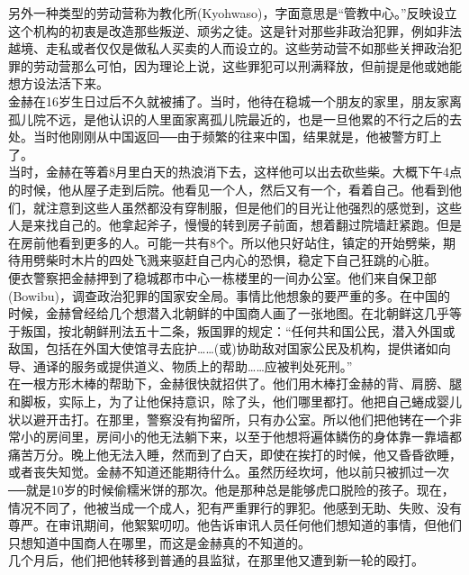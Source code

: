 另外一种类型的劳动营称为教化所(Kyohwaso)，字面意思是“管教中心。”反映设立这个机构的初衷是改造那些叛逆、顽劣之徒。这是针对那些非政治犯罪，例如非法越境、走私或者仅仅是做私人买卖的人而设立的。这些劳动营不如那些关押政治犯罪的劳动营那么可怕，因为理论上说，这些罪犯可以刑满释放，但前提是他或她能想方设法活下来。\\

金赫在16岁生日过后不久就被捕了。当时，他待在稳城一个朋友的家里，朋友家离孤儿院不远，是他认识的人里面家离孤儿院最近的，也是一旦他累的不行之后的去处。当时他刚刚从中国返回──由于频繁的往来中国，结果就是，他被警方盯上了。\\

当时，金赫在等着8月里白天的热浪消下去，这样他可以出去砍些柴。大概下午4点的时候，他从屋子走到后院。他看见一个人，然后又有一个，看着自己。他看到他们，就注意到这些人虽然都没有穿制服，但是他们的目光让他强烈的感觉到，这些人是来找自己的。他拿起斧子，慢慢的转到房子前面，想着翻过院墙赶紧跑。但是在房前他看到更多的人。可能一共有8个。所以他只好站住，镇定的开始劈柴，期待用劈柴时木片的四处飞溅来驱赶自己内心的恐惧，稳定下自己狂跳的心脏。\\

便衣警察把金赫押到了稳城郡市中心一栋楼里的一间办公室。他们来自保卫部(Bowibu)，调查政治犯罪的国家安全局。事情比他想象的要严重的多。在中国的时候，金赫曾经给几个想潜入北朝鲜的中国商人画了一张地图。在北朝鲜这几乎等于叛国，按北朝鲜刑法五十二条，叛国罪的规定：“任何共和国公民，潜入外国或敌国，包括在外国大使馆寻去庇护……(或)协助敌对国家公民及机构，提供诸如向导、通译的服务或提供道义、物质上的帮助……应被判处死刑。”\\

在一根方形木棒的帮助下，金赫很快就招供了。他们用木棒打金赫的背、肩膀、腿和脚板，实际上，为了让他保持意识，除了头，他们哪里都打。他把自己蜷成婴儿状以避开击打。在那里，警察没有拘留所，只有办公室。所以他们把他铐在一个非常小的房间里，房间小的他无法躺下来，以至于他想将遍体鳞伤的身体靠一靠墙都痛苦万分。晚上他无法入睡，然而到了白天，即使在挨打的时候，他又昏昏欲睡，或者丧失知觉。金赫不知道还能期待什么。虽然历经坎坷，他以前只被抓过一次──就是10岁的时候偷糯米饼的那次。他是那种总是能够虎口脱险的孩子。现在，情况不同了，他被当成一个成人，犯有严重罪行的罪犯。他感到无助、失败、没有尊严。在审讯期间，他絮絮叨叨。他告诉审讯人员任何他们想知道的事情，但他们只想知道中国商人在哪里，而这是金赫真的不知道的。\\

几个月后，他们把他转移到普通的县监狱，在那里他又遭到新一轮的殴打。\\

